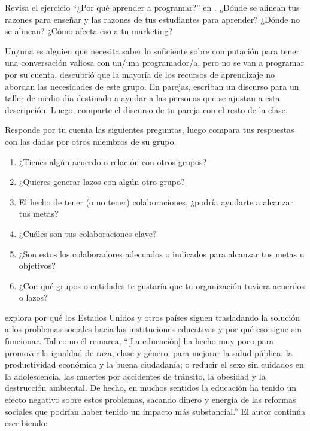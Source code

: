 
Revisa el ejercicio ``¿Por qué aprender a programar?'' en .
¿Dónde se alinean tus razones para enseñar y las razones de tus estudiantes para aprender?
¿Dónde no se alinean?
¿Cómo afecta eso a tu marketing?


Un/una 
es alguien que necesita saber lo suficiente sobre computación
para tener una conversación valiosa con un/una programador/a,
pero no se van a programar por su cuenta.
\cite{Wang2018} descubrió que la mayoría de los recursos de aprendizaje no abordan las necesidades de este grupo.
En parejas,
escriban un discurso para un taller de medio día destinado a ayudar a las personas que se ajustan a esta descripción.
Luego, comparte el discurso de tu pareja con el resto de la clase.

Responde por tu cuenta las siguientes preguntas,
luego compara tus respuestas con las dadas por otros miembros de su grupo.

\begin{enumerate}

\item
¿Tienes algún acuerdo o relación con otros grupos?

\item
¿Quieres generar lazos con algún otro grupo?

\item
El hecho de tener (o no tener) colaboraciones, 
¿podría ayudarte a alcanzar tus metas?

\item
¿Cuáles son tus colaboraciones clave?

\item
¿Son estos los colaboradores adecuados o indicados para alcanzar tus metas u objetivos?

\item
¿Con qué grupos o entidades te gustaría que tu organización
tuviera acuerdos o lazos?



\end{enumerate}


\cite{Laba2008} explora por qué los Estados Unidos y otros países
siguen trasladando la solución a los problemas sociales hacia las instituciones educativas 
y por qué eso sigue sin funcionar.
Tal como él remarca,
``[La educación] ha hecho muy poco para promover la igualdad de raza, clase y género;
para mejorar la salud pública, la productividad económica y la buena ciudadanía;
o reducir el sexo sin cuidados en la adolescencia, las muertes por accidentes de tránsito, la obesidad y la destrucción ambiental.
De hecho,
en muchos sentidos la educación ha tenido un efecto negativo sobre estos problemas,
sacando dinero y energía de las reformas sociales que podrían haber tenido un impacto más substancial.”
El autor continúa escribiendo: 

